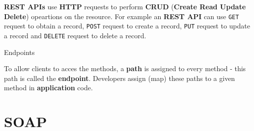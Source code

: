 \textbf{REST APIs} use \textbf{HTTP} requests to perform \textbf{CRUD} (\textbf{Create Read Update Delete}) opeartions on the resource. For example an \textbf{REST API} can use \texttt{GET} request to obtain a record, \texttt{POST} request to create a record, \texttt{PUT} request to update a record and \texttt{DELETE} request to delete a record.

Endpoints

To allow clients to acces the methods, a \textbf{path} is assigned to every method - this path is called the \textbf{endpoint}. Developers assign (map) these paths to a given method in \textbf{application} code.

\section{SOAP}